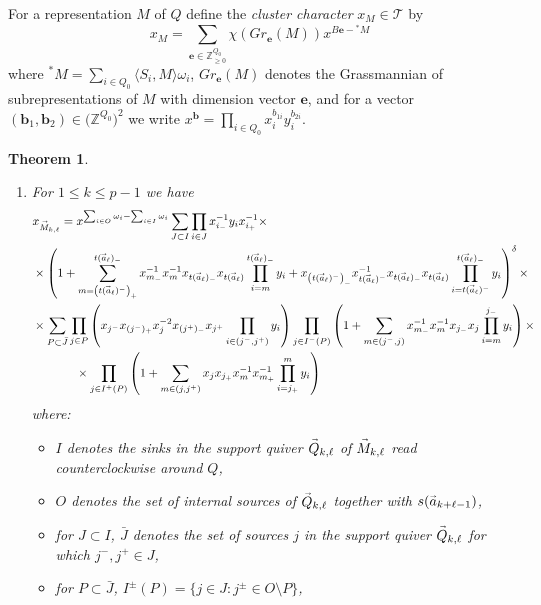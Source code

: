 \documentclass[11pt]{amsart}
\newcommand{\cT}{\mathcal{T}}
\newcommand{\ZZ}{\mathbb{Z}}
\newcommand{\bfb}{\mathbf{b}}
\newcommand{\bfe}{\mathbf{e}}
\renewcommand{\vec}[1]{\accentset{\shortrightarrow}{#1}}
\newtheorem{theorem}{Theorem}[section]
\numberwithin{equation}{section}
\begin{document}
  For a representation $M$ of $Q$ define the \emph{cluster character} $x_M\in\cT$ by
  \begin{equation}
    x_M=\sum_{\bfe\in\ZZ^{Q_0}_{\ge0}}\chi(Gr_\bfe(M))x^{B\bfe-{}^*M}
  \end{equation}
  where ${}^*M=\sum\limits_{i\in Q_0}\langle S_i,M\rangle\omega_i$, $Gr_\bfe(M)$ denotes the Grassmannian of subrepresentations of $M$ with dimension vector $\bfe$, and for a vector $(\bfb_1,\bfb_2)\in\big(\ZZ^{Q_0}\big)^2$ we write $x^\bfb=\prod_{i\in Q_0} x_i^{b_{1i}}y_i^{b_{2i}}$.
  \begin{theorem}\mbox{}
    \begin{enumerate}
      \item For $1\le k\le p-1$ we have
      \begin{align}
        &x_{\vec{M}_{k,\ell}}=x^{\sum_{i\in O}\omega_i-\sum_{i\in I}\omega_i}\sum_{J\subset I}\prod_{i\in J}x_{i_-}^{-1}y_ix_{i_+}^{-1}\times\\
        \nonumber&\times\left(1+\sum_{m=\left(t(\vec{a}_\ell)^-\right)_+}^{t(\vec{a}_\ell)_-}x_{m_-}^{-1}x_m^{-1}x_{t(\vec{a}_\ell)_-}x_{t(\vec{a}_\ell)}\prod_{i=m}^{t(\vec{a}_\ell)_-}y_i+x_{\left(t(\vec{a}_\ell)^-\right)_-}x_{t(\vec{a}_\ell)^-}^{-1}x_{t(\vec{a}_\ell)_-}x_{t(\vec{a}_\ell)}\prod_{i=t(\vec{a}_\ell)^-}^{t(\vec{a}_\ell)_-}y_i\right)^\delta\times\\
        \nonumber&\times\sum_{P\subset\bar{J}}\prod_{j\in P}\left(x_{j^-}x_{(j^-)_+}x_j^{-2}x_{(j^+)_-}x_{j^+}\prod_{i\in(j^-,j^+)}y_i\right)\prod_{j\in I^-(P)}\left(1+\sum_{m\in(j^-,j)}x_{m_-}^{-1}x_m^{-1}x_{j_-}x_j\prod_{i=m}^{j_-}y_i\right)\times\\
        \nonumber&\hspace{0.5in}\times\prod_{j\in I^+(P)}\left(1+\sum_{m\in(j,j^+)}x_jx_{j_+}x_m^{-1}x_{m_+}^{-1}\prod_{i=j_+}^m y_i\right)
      \end{align}
      where:
      \begin{itemize}
        \item $I$ denotes the sinks in the support quiver $\vec{Q}_{k,\ell}$ of $\vec{M}_{k,\ell}$ read counterclockwise around $Q$,
        \item $O$ denotes the set of internal sources of $\vec{Q}_{k,\ell}$ together with $s(\vec{a}_{k+\ell-1})$,
        \item for $J\subset I$, $\bar{J}$ denotes the set of sources $j$ in the support quiver $\vec{Q}_{k,\ell}$ for which $j^-,j^+\in J$,
        \item for $P\subset\bar{J}$, $I^\pm(P)=\{j\in J:j^\pm\in O\setminus P\}$,

\end{itemize}
\end{enumerate}
\end{theorem}
\end{document}
